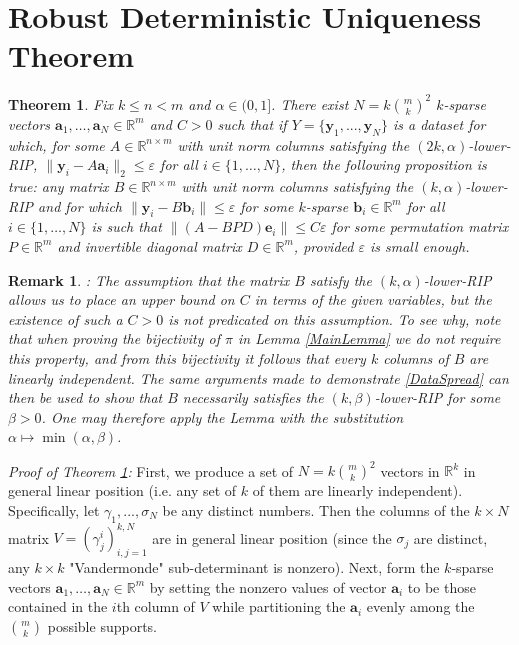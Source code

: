 \documentclass[journal,onecolumn]{IEEEtran}
\newtheorem{theorem}{Theorem}
\newtheorem{remark}{Remark}
\begin{document}

\section{Robust Deterministic Uniqueness Theorem}

\begin{theorem}\label{RobustDUT}
Fix $k \leq n < m$ and $\alpha \in (0,1]$. There exist $N = k {m \choose k}^2$ $k$-sparse vectors $\mathbf{a}_1, \ldots, \mathbf{a}_N \in \mathbb{R}^m$ and $C > 0$ such that if $Y = \{\mathbf{y}_1, ..., \mathbf{y}_N \}$ is a dataset for which, for some $A \in \mathbb{R}^{n \times m}$ with unit norm columns satisfying the $(2k, \alpha)$-lower-RIP, $\|\mathbf{y}_i - A\mathbf{a}_i\|_2 \leq \varepsilon$ for all $i \in \{1, \ldots, N\}$, then the following proposition is true: any matrix $B \in \mathbb{R}^{n \times m}$ with unit norm columns satisfying the $(k,\alpha)$-lower-RIP and for which $\|\mathbf{y}_i - B\mathbf{b}_i\| \leq \varepsilon$ for some $k$-sparse $\mathbf{b}_i \in \mathbb{R}^m$ for all $i \in \{1, \ldots, N\}$ is such that $\|(A - BPD)\mathbf{e}_i\| \leq C\varepsilon$ for some permutation matrix $P \in \mathbb{R}^m$ and invertible diagonal matrix $D \in \mathbb{R}^m$, provided $\varepsilon$ is small enough.
\end{theorem}

\begin{remark}: The assumption that the matrix $B$ satisfy the $(k,\alpha)$-lower-RIP allows us to place an upper bound on $C$ in terms of the given variables, but the existence of such a $C > 0$ is not predicated on this assumption. To see why, note that when proving the bijectivity of $\pi$ in Lemma \ref{MainLemma} we do not require this property, and from this bijectivity it follows that every $k$ columns of $B$ are linearly independent. The same arguments made to demonstrate \eqref{DataSpread} can then be used to show that $B$ necessarily satisfies the $(k,\beta)$-lower-RIP for some $\beta > 0$. One may therefore apply the Lemma with the substitution $\alpha \mapsto \min(\alpha, \beta)$.
\end{remark}

\emph{Proof of Theorem \ref{RobustDUT}:} First, we produce a set of $N = k{m \choose k}^2$ vectors in $\mathbb{R}^k$ in general linear position (i.e. any set of $k$ of them are linearly independent). Specifically, let $\gamma_1, ..., \sigma_N$ be any distinct numbers. Then the columns of the $k \times N$ matrix $V = (\gamma^i_j)^{k,N}_{i,j=1}$ are in general linear position (since the $\sigma_j$ are distinct, any $k \times k$ "Vandermonde" sub-determinant is nonzero). Next, form the $k$-sparse vectors $\mathbf{a}_1, \ldots, \mathbf{a}_N \in \mathbb{R}^m$ by setting the nonzero values of vector $\mathbf{a}_i$ to be those contained in the $i$th column of $V$ while partitioning the $\mathbf{a}_i$ evenly among the ${m \choose k}$ possible supports.
\end{document}
